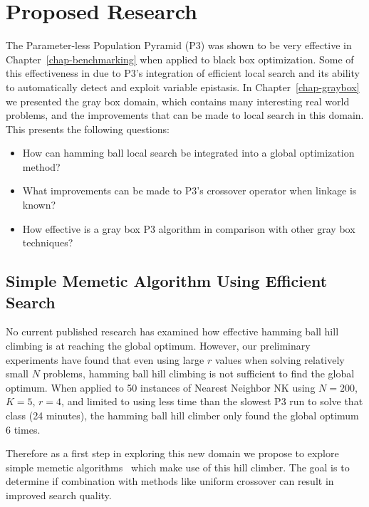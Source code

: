 \chapter{Proposed Research}
The Parameter-less Population Pyramid (P3) was shown to be very effective in Chapter~\ref{chap-benchmarking}
when applied to black box optimization. Some of this effectiveness in due to P3's integration of
efficient local search and its ability to automatically detect and exploit variable epistasis.
In Chapter~\ref{chap-graybox} we presented the gray box domain, which contains many interesting
real world problems, and the improvements that can be made to local search in this domain.
This presents the following questions:

\begin{itemize}
\item How can hamming ball local search be integrated into a global optimization method?
\item What improvements can be made to P3's crossover operator when linkage is known?
\item How effective is a gray box P3 algorithm in comparison with other gray box techniques?
\end{itemize}

\section{Simple Memetic Algorithm Using Efficient Search}
No current published research has examined how effective hamming ball hill climbing is at reaching the global
optimum. However, our preliminary experiments have found that even using large $r$ values when solving relatively small $N$
problems, hamming ball hill climbing is not sufficient to find the global optimum. When applied to 50 instances
of Nearest Neighbor NK using $N=200$, $K=5$, $r=4$, and limited to using less time than the slowest P3 run to solve that class (24 minutes),
the hamming ball hill climber only found the global optimum 6 times.

Therefore as a first step in exploring this new domain we propose to explore simple memetic algorithms~\cite{chen:2011:memetic}
which make use of this hill climber. The goal is to determine if combination with methods like uniform crossover
can result in improved search quality.

